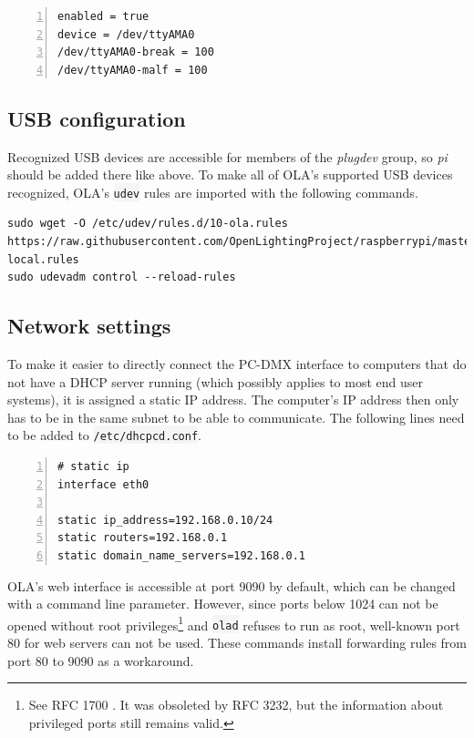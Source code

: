 \begin{lstlisting}[numbers=left]
enabled = true
device = /dev/ttyAMA0
/dev/ttyAMA0-break = 100
/dev/ttyAMA0-malf = 100
\end{lstlisting}

\subsection{USB configuration}\label{sec:usb-configuration}

Recognized USB devices are accessible for members of the \emph{plugdev}
group, so \emph{pi} should be added there like above. To make all of
OLA's supported USB devices recognized, OLA's \colorbox{WhiteSmoke}{\lstinline!udev!} rules are
imported with the following commands.

\begin{lstlisting}[style=myBash, deletekeywords=local]
sudo wget -O /etc/udev/rules.d/10-ola.rules https://raw.githubusercontent.com/OpenLightingProject/raspberrypi/master/etc/udev/rules.d/10-local.rules
sudo udevadm control --reload-rules
\end{lstlisting}

\subsection{Network settings}\label{network-settings}

To make it easier to directly connect the PC-DMX interface to computers
that do not have a DHCP server running (which possibly applies to most
end user systems), it is assigned a static IP address. The computer's IP
address then only has to be in the same subnet to be able to
communicate. The following lines need to be added to
\colorbox{WhiteSmoke}{\lstinline!/etc/dhcpcd.conf!}.

\begin{lstlisting}[numbers=left, style=myBash, morekeywords={interface, static}]
# static ip
interface eth0

static ip_address=192.168.0.10/24
static routers=192.168.0.1
static domain_name_servers=192.168.0.1
\end{lstlisting}

OLA's web interface is accessible at port 9090 by default, which can be
changed with a command line parameter. However, since ports below 1024
can not be opened without root privileges\footnote{See RFC 1700
  \citep{rfc1700}. It was obsoleted by RFC 3232, but the information
  about privileged ports still remains valid.} and \colorbox{WhiteSmoke}{\lstinline!olad!}
refuses to run as root, well-known port 80 for web servers can not be
used. These commands install forwarding rules from port 80 to 9090 as a
workaround.

